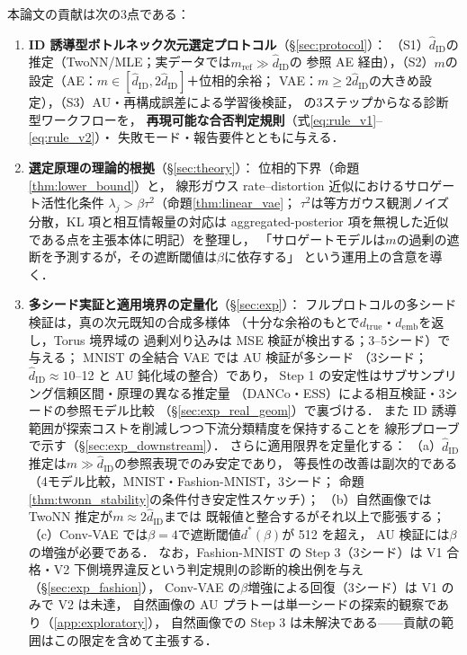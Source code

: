 \documentclass[11pt,a4paper]{jsarticle}
\newcommand{\hatdID}{\hat{d}_{\mathrm{ID}}}
\newcommand{\dtrue}{d_{\mathrm{true}}}
\newcommand{\demb}{d_{\mathrm{emb}}}
\newcommand{\dstar}{d^{*}(\beta)}
\begin{document}
本論文の貢献は次の3点である：
\begin{enumerate}
  \item \textbf{ID 誘導型ボトルネック次元選定プロトコル}（§\ref{sec:protocol}）：
        （S1）$\hatdID$の推定（TwoNN/MLE；実データでは$m_{\mathrm{ref}} \gg \hatdID$の
        参照 AE 経由），（S2）$m$の設定（AE：$m \in [\hatdID, 2\hatdID]$＋位相的余裕；
        VAE：$m \geq 2\hatdID$の大きめ設定），（S3）AU・再構成誤差による学習後検証，
        の3ステップからなる診断型ワークフローを，
        \textbf{再現可能な合否判定規則}（式\eqref{eq:rule_v1}--\eqref{eq:rule_v2}）・
        失敗モード・報告要件とともに与える．
  \item \textbf{選定原理の理論的根拠}（§\ref{sec:theory}）：
        位相的下界（命題\ref{thm:lower_bound}）と，
        線形ガウス rate--distortion 近似におけるサロゲート活性化条件
        $\lambda_j > \beta\tau^2$（命題\ref{thm:linear_vae}；
        $\tau^2$は等方ガウス観測ノイズ分散，KL 項と相互情報量の対応は
        aggregated-posterior 項を無視した近似である点を主張本体に明記）を整理し，
        「サロゲートモデルは$m$の過剰の遮断を予測するが，その遮断閾値は$\beta$に依存する」
        という運用上の含意を導く．
  \item \textbf{多シード実証と適用境界の定量化}（§\ref{sec:exp}）：
        フルプロトコルの多シード検証は，真の次元既知の合成多様体
        （十分な余裕のもとで$\dtrue$・$\demb$を返し，Torus 境界域の
        過剰刈り込みは MSE 検証が検出する；3--5シード）で与える；
        MNIST の全結合 VAE では AU 検証が多シード
        （3シード；$\hatdID \approx 10$--12 と AU 鈍化域の整合）であり，
        Step 1 の安定性はサブサンプリング信頼区間・原理の異なる推定量
        （DANCo・ESS）による相互検証・3シードの参照モデル比較
        （§\ref{sec:exp_real_geom}）で裏づける．
        また ID 誘導範囲が探索コストを削減しつつ下流分類精度を保持することを
        線形プローブで示す（§\ref{sec:exp_downstream}）．
        さらに適用限界を定量化する：
        （a）$\hatdID$推定は$m \gg \hatdID$の参照表現でのみ安定であり，
        等長性の改善は副次的である（4モデル比較，MNIST・Fashion-MNIST，3シード；
        命題\ref{thm:twonn_stability}の条件付き安定性スケッチ）；
        （b）自然画像では TwoNN 推定が$m \approx 2\hatdID$までは
        既報値\cite{pope2021intrinsic}と整合するがそれ以上で膨張する；
        （c）Conv-VAE では$\beta = 4$で遮断閾値$\dstar$が 512 を超え，
        AU 検証には$\beta$の増強が必要である．
        なお，Fashion-MNIST の Step 3（3シード）は
        V1 合格・V2 下側境界違反という判定規則の診断的検出例を与え
        （§\ref{sec:exp_fashion}），
        Conv-VAE の$\beta$増強による回復（3シード）は V1 のみで V2 は未達，
        自然画像の AU プラトーは単一シードの探索的観察であり（\ref{app:exploratory}），
        自然画像での Step 3 は未解決である——貢献の範囲はこの限定を含めて主張する．
\end{enumerate}
\end{document}
